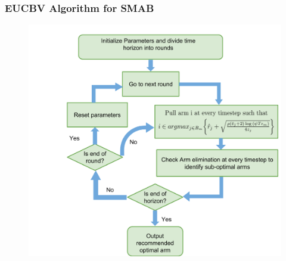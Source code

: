\begin{frame}
\frametitle{EUCBV Algorithm for SMAB}
\begin{figure}
\includegraphics[scale=0.24]{img/EUCBV_flow.png}
\end{figure}
\end{frame}